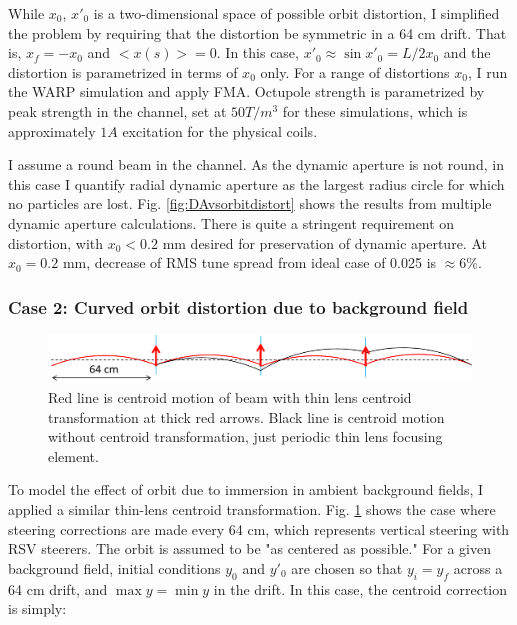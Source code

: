 While $x_0$, $x'_0$ is a two-dimensional space of possible orbit distortion, I simplified the problem by requiring that the distortion be symmetric in a 64 cm drift. That is, $x_f = -x_0$ and $<x(s)> = 0$. In this case, $x'_0 \approx \sin{x'_0} = L/2x_0$ and the distortion is parametrized in terms of $x_0$ only. For a range of distortions $x_0$, I run the WARP simulation and apply FMA. Octupole strength is parametrized by peak strength in the channel, set at $50 T/m^3$ for these simulations, which is approximately $1 A$ excitation for the physical coils. 
 
I assume a round beam in the channel. As the dynamic aperture is not round, in this case I quantify radial dynamic aperture as the largest radius circle for which no particles are lost. Fig. \ref{fig:DAvsorbitdistort} shows the results from multiple dynamic aperture calculations. There is quite a stringent requirement on distortion, with $x_0 < 0.2$ mm desired for preservation of dynamic aperture. At $x_0 = 0.2$ mm, decrease of RMS tune spread from ideal case of 0.025 is $\approx 6\%$.




\subsubsection{Case 2: Curved orbit distortion due to background field}

\begin{figure}
\centering
\includegraphics[width=\textwidth]{5.figures/steeringtolerance/vert_bg_field_distortion_cartoon.png}
\caption{Red line is centroid motion of beam with thin lens centroid transformation at thick red arrows. Black line is centroid motion without centroid transformation, just periodic thin lens focusing element.}
\label{fig:vertcurvedorbitdistortion}
\end{figure}

To model the effect of orbit  due to immersion in ambient background fields, I applied a similar thin-lens centroid transformation. Fig. \ref{fig:vertcurvedorbitdistortion} shows the case where steering corrections are made every 64 cm, which represents vertical steering with RSV steerers. The orbit is assumed to be "as centered as possible." For a given background field, initial conditions $y_0$ and $y'_0$ are chosen so that $y_i=y_f$ across a 64 cm drift, and $\max{y}=\min{y}$ in the drift. In this case, the centroid correction is simply:

